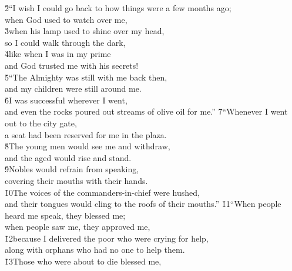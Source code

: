 \begin{poetry}
\poeml \v{2}``I wish I could go back to how things were a few months ago; \\
\poemll    when God used to watch over me, \\
\poeml \v{3}when his lamp used to shine over my head, \\
\poemll    so I could walk through the dark, \\
\poeml \v{4}like when I was in my prime \\
\poemll    and God trusted me with his secrets! \\
\poeml \v{5}``The Almighty was still with me back then, \\
\poemll    and my children were still around me. \\
\poeml \v{6}I was successful wherever I went, \\
\poemll    and even the rocks poured out streams of olive oil for me.''
\poeml \v{7}``Whenever I went out to the city gate, \\
\poemll    a seat had been reserved for me in the plaza. \\
\poeml \v{8}The young men would see me and withdraw, \\
\poemll    and the aged would rise and stand. \\
\poeml \v{9}Nobles would refrain from speaking, \\
\poemll    covering their mouths with their hands. \\
\poeml \v{10}The voices of the commanders-in-chief were hushed, \\
\poemll    and their tongues would cling to the roofs of their mouths.''
\poeml \v{11}``When people heard me speak, they blessed me; \\
\poemll    when people saw me, they approved me, \\
\poeml \v{12}because I delivered the poor who were crying for help, \\
\poemll    along with orphans who had no one to help them. \\
\poeml \v{13}Those who were about to die blessed me, \\

\end{poetry}
